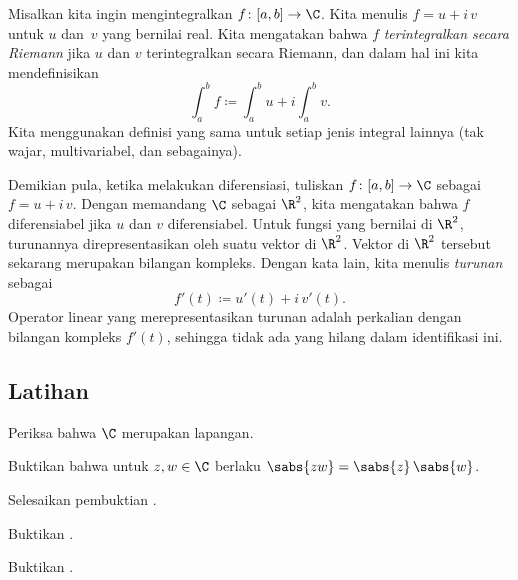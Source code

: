 Misalkan kita ingin mengintegralkan
$f \colon [a,b] \to \C$. Kita menulis
$f = u+i\,v$ untuk $u$ dan~$v$ yang bernilai real.
Kita mengatakan bahwa $f$ \emph{terintegralkan secara Riemann}
jika $u$ dan $v$ terintegralkan secara Riemann,
dan dalam hal ini kita mendefinisikan
\begin{equation*}
\int_a^b f \coloneqq \int_a^b u + i \int_a^b v .
\end{equation*}
Kita menggunakan definisi yang sama untuk setiap jenis integral lainnya (tak wajar,
multivariabel, dan sebagainya).

Demikian pula, ketika melakukan diferensiasi, tuliskan $f \colon [a,b] \to \C$ sebagai
$f = u+i\,v$. Dengan memandang $\C$ sebagai $\R^2$, kita mengatakan bahwa $f$ diferensiabel
jika $u$ dan $v$ diferensiabel. Untuk fungsi yang bernilai di $\R^2$, turunannya
direpresentasikan oleh suatu vektor di $\R^2$. Vektor di $\R^2$ tersebut sekarang merupakan bilangan
kompleks. Dengan kata lain,
kita menulis
\emph{turunan}
sebagai
\begin{equation*}
f'(t) \coloneqq u'(t) + i \, v'(t) .
\end{equation*}
Operator linear yang merepresentasikan turunan adalah perkalian dengan
bilangan kompleks $f'(t)$, sehingga tidak ada yang hilang dalam identifikasi ini.


\subsection{Latihan}

\begin{exercise}
Periksa bahwa $\C$ merupakan lapangan.
\end{exercise}

\begin{exercise}
Buktikan bahwa untuk $z,w \in \C$ berlaku
$\sabs{zw} = \sabs{z} \, \sabs{w}$.
\end{exercise}

\begin{exercise}
Selesaikan pembuktian .
\end{exercise}

\begin{exercise}
Buktikan .
\end{exercise}

\begin{exercise}
Buktikan .
\end{exercise}

